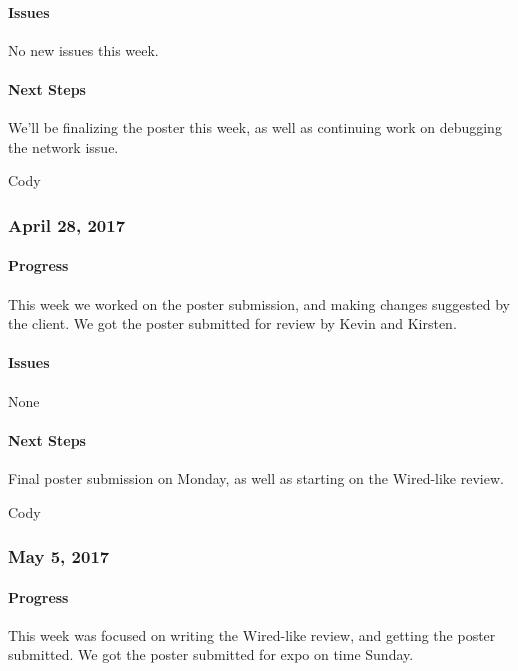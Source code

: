 \documentclass[10pt,onecolumn,journal,draftclsnofoot]{IEEEtran}
\begin{document}
\paragraph{Issues} 

No new issues this week.

\paragraph{Next Steps} 

We'll be finalizing the poster this week, as well as continuing work on
debugging the network issue.

Cody

\subsubsection{April 28, 2017} 

\paragraph{Progress} 

This week we worked on the poster submission, and making changes
suggested by the client. We got the poster submitted for review by Kevin
and Kirsten.

\paragraph{Issues} 

None

\paragraph{Next Steps} 

Final poster submission on Monday, as well as starting on the Wired-like
review.

Cody

\subsubsection{May 5, 2017} 

\paragraph{Progress} 

This week was focused on writing the Wired-like review, and getting the
poster submitted. We got the poster submitted for expo on time Sunday.
\end{document}
